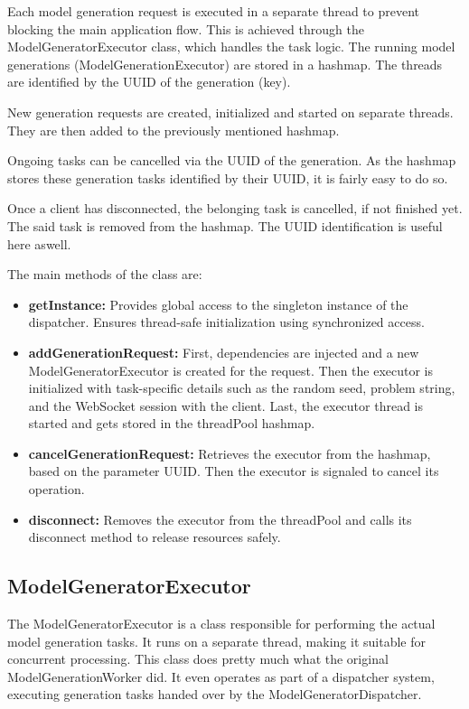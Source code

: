 			Each model generation request is executed in a separate thread to prevent blocking the main application flow. 
			This is achieved through the ModelGeneratorExecutor class, which handles the task logic.
			The running model generations (ModelGenerationExecutor) are stored in a hashmap. The threads are identified by the UUID of the 
			generation (key).

			New generation requests are created, initialized and started on separate threads. They are then added to the previously mentioned hashmap.

			\label{servercanceldispatcher}Ongoing tasks can be cancelled via the UUID of the generation. As the hashmap stores these generation tasks identified by their UUID, it is fairly easy to do so.

			Once a client has disconnected, the belonging task is cancelled, if not finished yet. The said task is removed from the hashmap. The UUID identification is 
			useful here aswell.

			The main methods of the class are:
			\begin{itemize}
				\item \textbf{getInstance:} Provides global access to the singleton instance of the dispatcher. Ensures thread-safe initialization using synchronized access.
				\item \textbf{addGenerationRequest:} First, dependencies are injected and a new ModelGeneratorExecutor is created for the request.
				Then the executor is initialized with task-specific details such as the random seed, problem string, and the WebSocket session with the client.
				Last, the executor thread is started and gets stored in the threadPool hashmap.
				\item \textbf{cancelGenerationRequest:} Retrieves the executor from the hashmap, based on the parameter UUID. Then the executor is signaled to
				cancel its operation.
				\item \textbf{disconnect:} Removes the executor from the threadPool and calls its disconnect method to release resources safely.
			\end{itemize}

		\subsection{ModelGeneratorExecutor}\label{ModelGenerationExecutor}
		The ModelGeneratorExecutor is a class responsible for performing the actual model generation tasks. It runs on a separate thread, 
		making it suitable for concurrent processing. This class does pretty much what the original ModelGenerationWorker did. 
		It even operates as part of a dispatcher system, executing generation tasks handed over by the ModelGeneratorDispatcher.

